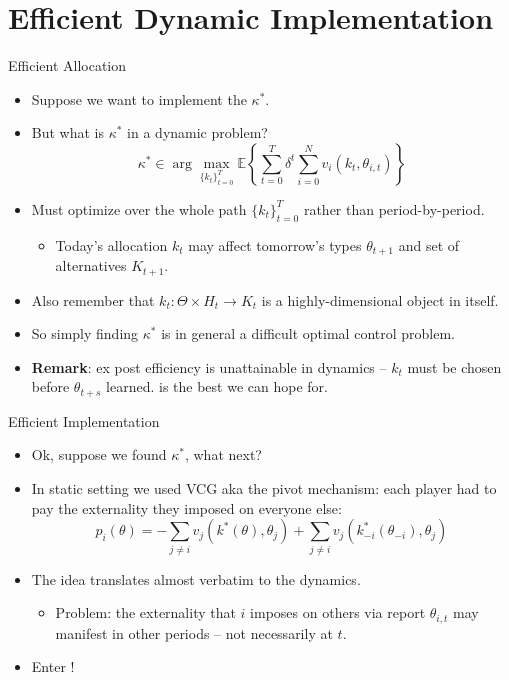 \documentclass[english,10pt
,aspectratio=169
]{beamer}
\begin{document}
\section{Efficient Dynamic Implementation}

\begin{frame}{Efficient Allocation}
\begin{itemize}
	\item Suppose we want to implement the  $\kappa^*$.
	\item But what is $\kappa^*$ in a dynamic problem?
	$$ \kappa^* \in \arg \max_{\{k_t\}_{t=0}^T} \mathbb{E} \left\{ \sum_{t=0}^T \delta^t \sum_{i=0}^N v_i(k_t,\theta_{i,t}) \right\}$$
	\item Must optimize over the whole path $\{k_t\}_{t=0}^T$ rather than period-by-period.
	\begin{itemize}
		\item Today's allocation $k_t$ may affect tomorrow's types $\theta_{t+1}$ and set of alternatives $K_{t+1}$.
	\end{itemize}
	\item Also remember that $k_t : \Theta \times H_t \to K_t$ is a highly-dimensional object in itself.
	\item So simply finding $\kappa^*$ is in general a difficult optimal control problem.
	\item \textbf{Remark}: \alert{ex post efficiency} is \alert{unattainable} in dynamics -- $k_t$ must be chosen before $\theta_{t+s}$ learned.  is the best we can hope for.
\end{itemize}
\end{frame}


\begin{frame}{Efficient Implementation}
\begin{itemize}
	\item Ok, suppose we found $\kappa^*$, what next?
	\item In static setting we used VCG aka the pivot mechanism: each player had to pay the externality they imposed on everyone else:
	$$ p_i(\theta) = -\sum_{j \neq i} v_j \left( k^*(\theta),\theta_j \right) + \sum_{j \neq i} v_j \left( k^*_{-i}(\theta_{-i}),\theta_j \right) $$
	\item The idea translates almost verbatim to the dynamics.
	\begin{itemize}
		\item Problem: the externality that $i$ imposes on others via report $\theta_{i,t}$ may manifest in other periods -- not necessarily at $t$.
	\end{itemize}
	\item Enter ! \citep{bergemann_dynamic_2010}
\end{itemize}
\end{frame}
\end{document}

